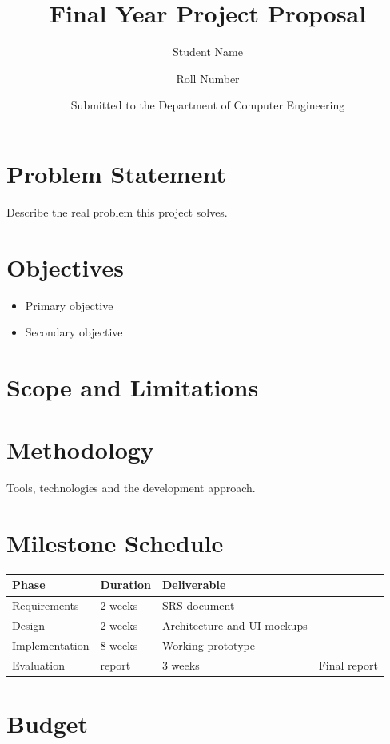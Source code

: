 \documentclass[12pt]{report}
\title{Final Year Project Proposal}
\author{Student Name \and Roll Number}
\date{Submitted to the Department of Computer Engineering}
\begin{document}
\maketitle

\chapter{Problem Statement}
Describe the real problem this project solves.

\chapter{Objectives}
\begin{itemize}
  \item Primary objective
  \item Secondary objective
\end{itemize}

\chapter{Scope and Limitations}

\chapter{Methodology}
Tools, technologies and the development approach.

\chapter{Milestone Schedule}
\begin{tabular}{lll}
\toprule
Phase & Duration & Deliverable \\
\midrule
Requirements & 2 weeks & SRS document \\
Design & 2 weeks & Architecture and UI mockups \\
Implementation & 8 weeks & Working prototype \\
Evaluation & report & 3 weeks & Final report \\
\bottomrule
\end{tabular}

\chapter{Budget}
\end{document}
